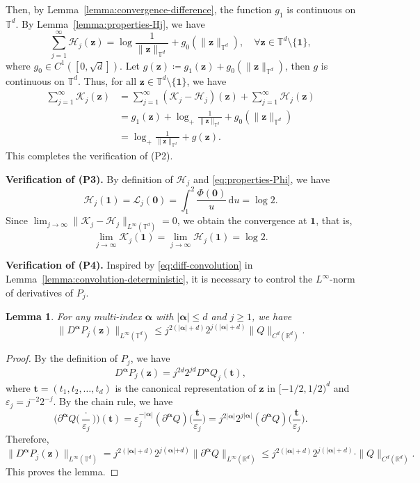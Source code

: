\documentclass[12pt]{amsart}
\newtheorem{lemma}[theorem]{Lemma}
\theoremstyle{definition}
\theoremstyle{remark}
\newcommand{\bt}{\boldsymbol{t}}
\newcommand{\bz}{\boldsymbol{z}}
\newcommand{\R}{\mathbb{R}}
\newcommand{\T}{\mathbb{T}}
\numberwithin{equation}{section}
\begin{document}
Then, by Lemma~\ref{lemma:convergence-difference}, the function $g_1$ is continuous on $\T^d$. By Lemma~\ref{lemma:properties-Hj}, we have
\[
\sum_{j=1}^\infty \mathcal{H}_j(\bz)=\log \frac{1}{\|\bz\|_{\T^d}}+g_0(\|\bz\|_{\T^d}),\quad \forall \bz\in \T^d\setminus\{\boldsymbol{1}\},
\]
where $g_0\in C^1([0,\sqrt{d}])$. Let $g(\bz)\coloneq g_1(\bz)+g_0(\|\bz\|_{\T^d})$, then $g$ is continuous on $\T^d$. Thus, for all $\bz\in \T^d\setminus\{\boldsymbol{1}\}$, we have
\begin{align*}
\sum_{j=1}^\infty \mathcal{K}_j(\bz)&=\sum_{j=1}^\infty (\mathcal{K}_j-\mathcal{H}_j)(\bz)+\sum_{j=1}^\infty \mathcal{H}_j(\bz)\\
&=g_1(\bz)+\log_+ \frac{1}{\|\bz\|_{\T^d}}+g_0(\|\bz\|_{\T^d})\\
&=\log_+ \frac{1}{\|\bz\|_{\T^d}}+g(\bz).
\end{align*}
This completes the verification of (P2).

\medskip
{\flushleft \bf Verification of (P3). }
By definition of $\mathcal{H}_j$ and \eqref{eq:properties-Phi}, we have
\[
\mathcal{H}_j(\boldsymbol{1})=\mathcal{L}_j(\boldsymbol{0})=\int_1^2 \frac{\Phi(\boldsymbol{0})}{u}\,\mathrm{d}u=\log 2.
\]
Since $\lim_{j\to \infty}\|\mathcal{K}_j-\mathcal{H}_j\|_{L^\infty(\T^d)}=0$, we obtain the convergence at $\boldsymbol{1}$, that is,
\[
\lim_{j\to \infty}\mathcal{K}_j(\boldsymbol{1})=\lim_{j\to \infty}\mathcal{H}_j(\boldsymbol{1})=\log 2.
\]

\medskip
{\flushleft \bf Verification of (P4). }
 Inspired by \eqref{eq:diff-convolution} in Lemma~\ref{lemma:convolution-deterministic}, it is necessary to control the $L^\infty$-norm of derivatives of $P_j$.
\begin{lemma}
	For any multi-index $\boldsymbol{\alpha}$ with $|\boldsymbol{\alpha}|\le d$ and $j\ge 1$, we have
	\[
	\|D^{\boldsymbol{\alpha}} P_j(\bz)\|_{L^\infty(\T^d)}\le j^{2(|\boldsymbol{\alpha}|+d)}2^{j(|\boldsymbol{\alpha}|+d)}\|Q\|_{C^d(\R^d)}.
	\]
\end{lemma}
\begin{proof}
	By the definition of $P_j$, we have
	\[
	D^{\boldsymbol{\alpha}} P_j(\bz)=j^{2d}2^{jd}D^{\boldsymbol{\alpha}} Q_j(\bt),
	\]
	where $\bt=(t_1,t_2,\ldots,t_d)$ is the canonical representation of $\bz$ in $[-1/2,1/2)^d$ and $\varepsilon_j=j^{-2}2^{-j}$. By the chain rule, we have
	\[
	\bigg(\partial^{\boldsymbol{\alpha}} Q\bigg(\frac{\cdot}{\varepsilon_j}\bigg)\bigg)(\bt)=\varepsilon_j^{-|\boldsymbol{\alpha}|}(\partial^{\boldsymbol{\alpha}} Q)\bigg(\frac{\bt}{\varepsilon_j}\bigg)=j^{2|\boldsymbol{\alpha}|}2^{j|\boldsymbol{\alpha}|}(\partial^{\boldsymbol{\alpha}} Q)\bigg(\frac{\bt}{\varepsilon_j}\bigg).
	\]
	Therefore, 
	\[
	\|D^{\boldsymbol{\alpha}} P_j(\bz)\|_{L^\infty(\T^d)}=j^{2(|\boldsymbol{\alpha}|+d)}2^{j(\boldsymbol{\alpha}|+d)}\|\partial^{\boldsymbol{\alpha}} Q\|_{L^\infty(\R^d)}\le j^{2(|\boldsymbol{\alpha}|+d)}2^{j(|\boldsymbol{\alpha}|+d)}\cdot\|Q\|_{C^d(\R^d)}.
	\]
	This proves the lemma.
\end{proof}
\end{document}

